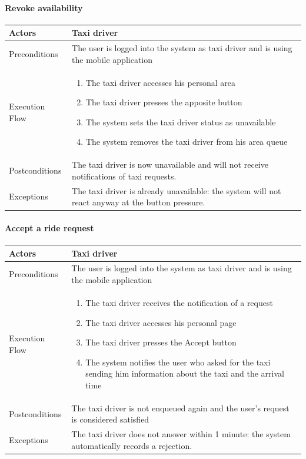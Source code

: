 		\paragraph{Revoke availability}
			\begin{center}
				\begin{tabular}{ | l | p{8cm} |}
					\hline Actors & Taxi driver
					\\ \hline
					Preconditions &
					The user is logged into the system as taxi driver and is using the mobile application
					\\ \hline
					Execution Flow &
					\begin{enumerate}
						\item The taxi driver accesses his personal area
						\item The taxi driver presses the apposite button
						\item The system sets the taxi driver status as unavailable
						\item The system removes the taxi driver from his area queue
					\end{enumerate}
					\\ \hline
					Postconditions & 
					The taxi driver is now unavailable and will not receive notifications of taxi requests.
					\\ \hline
					Exceptions &
					The taxi driver is already unavailable: the system will not react anyway at the button
					pressure.
					\\ \hline
				\end{tabular}
			\end{center}
		\paragraph{Accept a ride request}
			\begin{center}
				\begin{tabular}{ | l | p{8cm} |}
					\hline Actors & Taxi driver
					\\ \hline
					Preconditions &
					The user is logged into the system as taxi driver and is using the mobile application
					\\ \hline
					Execution Flow &
					\begin{enumerate}
						\item The taxi driver receives the notification of a request
						\item The taxi driver accesses his personal page
						\item The taxi driver presses the Accept button
						\item The system notifies the user who asked for the taxi sending him
						information about the taxi and the arrival time
					\end{enumerate}
					\\ \hline
					Postconditions & The taxi driver is not enqueued again and the user's request
					is considered satisfied
					\\ \hline
					Exceptions &
					The taxi driver does not answer within 1 minute:
					the system automatically records a rejection.
					\\ \hline
				\end{tabular}
			\end{center}
